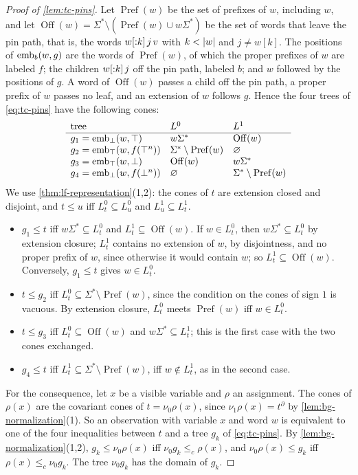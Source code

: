 \begin{proof}[Proof of \cref{lem:tc-pins}]
Let $\operatorname{Pref}(w)$ be the set of prefixes of $w$, including $w$, and
let $\operatorname{Off}(w)=\Sigma^*\setminus(\operatorname{Pref}(w)\cup
w\Sigma^*)$ be the set of words that leave the pin path, that is, the words
$w[{:}k]\,j\,v$ with $k<\lvert w\rvert$ and $j\ne w[k]$. The positions of
$\operatorname{emb}_b(w,g)$ are the words of $\operatorname{Pref}(w)$, of which the proper
prefixes of $w$ are labeled $f$; the children $w[{:}k]\,j$ off the pin path,
labeled $b$; and $w$ followed by the positions of $g$. A word of
$\operatorname{Off}(w)$ passes a child off the pin path, a proper prefix of $w$
passes no leaf, and an extension of $w$ follows $g$. Hence the four trees of
\cref{eq:tc-pins} have the following cones:
\[
\begin{array}{lll}
 \text{tree}&L^0&L^1\\\hline
 g_1=\operatorname{emb}_\bot(w,\top)&w\Sigma^*&\operatorname{Off}(w)\\
 g_2=\operatorname{emb}_\top(w,f(\top^n))&\Sigma^*\setminus\operatorname{Pref}(w)&\varnothing\\
 g_3=\operatorname{emb}_\top(w,\bot)&\operatorname{Off}(w)&w\Sigma^*\\
 g_4=\operatorname{emb}_\bot(w,f(\bot^n))&\varnothing&\Sigma^*\setminus\operatorname{Pref}(w)
\end{array}
\]
We use \cref{thm:lf-representation}(1,2): the cones of $t$ are extension
closed and disjoint, and $t\le u$ iff $L^0_t\subseteq L^0_u$ and
$L^1_u\subseteq L^1_t$.
\begin{itemize}[leftmargin=*]
\item $g_1\le t$ iff $w\Sigma^*\subseteq L^0_t$ and
  $L^1_t\subseteq\operatorname{Off}(w)$. If $w\in L^0_t$, then
  $w\Sigma^*\subseteq L^0_t$ by extension closure;
  $L^1_t$ contains no extension of $w$, by disjointness, and no proper prefix
  of $w$, since otherwise it would contain $w$; so $L^1_t\subseteq\operatorname{Off}(w)$.
  Conversely, $g_1\le t$ gives $w\in L^0_t$.
\item $t\le g_2$ iff $L^0_t\subseteq\Sigma^*\setminus\operatorname{Pref}(w)$, since the
  condition on the cones of sign $1$ is vacuous. By extension closure, $L^0_t$
  meets $\operatorname{Pref}(w)$ iff $w\in L^0_t$.
\item $t\le g_3$ iff $L^0_t\subseteq\operatorname{Off}(w)$ and $w\Sigma^*\subseteq L^1_t$;
  this is the first case with the two cones exchanged.
\item $g_4\le t$ iff $L^1_t\subseteq\Sigma^*\setminus\operatorname{Pref}(w)$, iff
  $w\notin L^1_t$, as in the second case.
\end{itemize}

For the consequence, let $x$ be a visible variable and $\rho$ an assignment.
The cones of $\rho(x)$ are the covariant cones of $t=\nu_0\rho(x)$, since
$\nu_1\rho(x)=t^\partial$ by \cref{lem:bg-normalization}(1). So an observation
with variable $x$ and word $w$ is equivalent to one of the four inequalities
between $t$ and a tree $g_k$ of \cref{eq:tc-pins}. By
\cref{lem:bg-normalization}(1,2), $g_k\le\nu_0\rho(x)$ iff
$\nu_0g_k\le_c\rho(x)$, and $\nu_0\rho(x)\le g_k$ iff $\rho(x)\le_c\nu_0g_k$.
The tree $\nu_0g_k$ has the domain of $g_k$.
\end{proof}

